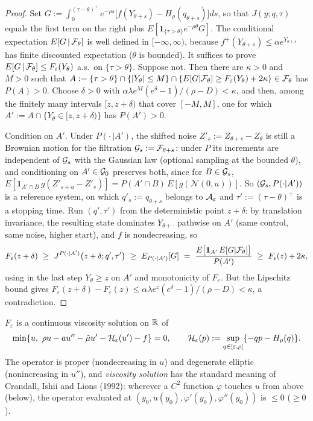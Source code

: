 \begin{proof}
Set $G:=\int_0^{(\tau-\theta)^+}e^{-\rho s}\big[f(Y_{\theta+s})-H_\rho(q_{\theta+s})\big]ds$, so that $J(y;q,\tau)$ equals the first term on the right plus $E[\mathbf 1_{\{\tau>\theta\}}e^{-\rho\theta}G]$. The conditional expectation $E[G\,|\,\mathcal{F}_\theta]$ is well defined in $[-\infty,\infty)$, because $f^+(Y_{\theta+s})\le\alpha e^{Y_{\theta+s}}$ has finite discounted expectation ($\theta$ is bounded). It suffices to prove $E[G\,|\,\mathcal{F}_\theta]\le F_\varepsilon(Y_\theta)$ a.s.\ on $\{\tau>\theta\}$. Suppose not. Then there are $\kappa>0$ and $M>0$ such that $A:=\{\tau>\theta\}\cap\{|Y_\theta|\le M\}\cap\{E[G|\mathcal{F}_\theta]\ge F_\varepsilon(Y_\theta)+2\kappa\}\in\mathcal{F}_\theta$ has $P(A)>0$. Choose $\delta>0$ with $\alpha\lambda e^{M}(e^{\delta}-1)/(\rho-D)<\kappa$, and then, among the finitely many intervals $[z,z+\delta)$ that cover $[-M,M]$, one for which $A':=A\cap\{Y_\theta\in[z,z+\delta)\}$ has $P(A')>0$.

Condition on $A'$. Under $P(\cdot\,|A')$, the shifted noise $Z'_s:=Z_{\theta+s}-Z_\theta$ is still a Brownian motion for the filtration $\mathcal{G}_s:=\mathcal{F}_{\theta+s}$: under $P$ its increments are independent of $\mathcal{G}_s$ with the Gaussian law (optional sampling at the bounded $\theta$), and conditioning on $A'\in\mathcal{G}_0$ preserves both, since for $B\in\mathcal{G}_s$, $E[\mathbf 1_{A'\cap B}\,g(Z'_{s+u}-Z'_s)]=P(A'\cap B)\,E[g(\mathcal N(0,u))]$. So $(\mathcal{G}_s,P(\cdot|A'))$ is a reference system, on which $q'_s:=q_{\theta+s}$ belongs to $\mathcal{A}_\varepsilon$ and $\tau':=(\tau-\theta)^+$ is a stopping time. Run $(q',\tau')$ from the deterministic point $z+\delta$: by translation invariance, the resulting state dominates $Y_{\theta+\cdot}$ pathwise on $A'$ (same control, same noise, higher start), and $f$ is nondecreasing, so
\[
F_\varepsilon(z+\delta)\ \ge\ J^{P(\cdot|A')}\big(z+\delta;q',\tau'\big)\ \ge\ E_{P(\cdot|A')}[G]\ =\ \frac{E\big[\mathbf 1_{A'}\,E[G|\cF_\theta]\big]}{P(A')}\ \ge\ F_\varepsilon(z)+2\kappa,
\]
using in the last step $Y_\theta\ge z$ on $A'$ and monotonicity of $F_\varepsilon$. But the Lipschitz bound gives $F_\varepsilon(z+\delta)-F_\varepsilon(z)\le\alpha\lambda e^{z}(e^{\delta}-1)/(\rho-D)<\kappa$, a contradiction.
\end{proof}

\begin{alemma}\label{lem:visc}
$F_\varepsilon$ is a continuous viscosity solution on $\mathbb{R}$ of
\[
\min\{u,\ \rho u-au''-\tilde\mu u'-\mathcal H_\varepsilon(u')-f\}=0,\qquad \mathcal H_\varepsilon(p):=\sup_{q\in[\varepsilon,\rho]}\{-qp-H_\rho(q)\} .
\]
The operator is proper (nondecreasing in $u$) and degenerate elliptic (nonincreasing in $u''$), and \emph{viscosity solution} has the standard meaning of Crandall, Ishii and Lions (1992): wherever a $C^2$ function $\varphi$ touches $u$ from above (below), the operator evaluated at $(y_0,u(y_0),\varphi'(y_0),\varphi''(y_0))$ is $\le0$ ($\ge0$).
\end{alemma}

